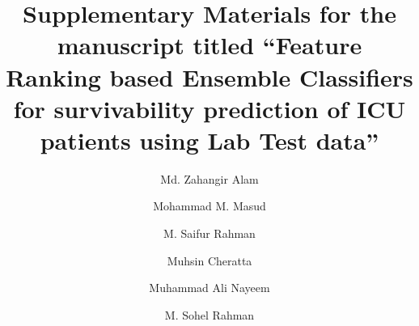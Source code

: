 \documentclass[3p,times]{elsarticle} %
\begin{document}
	
	\begin{frontmatter}
		
		
		
		
		\title{Supplementary Materials for the manuscript titled ``Feature Ranking based Ensemble Classifiers for survivability prediction of ICU patients using Lab Test data''}
		
		
		\author[buetaddress]{Md. Zahangir Alam}
		
		\author[uaeuaddress]{Mohammad M. Masud }
        
        \author[buetaddress]{M. Saifur Rahman}
		
		\author[uaeuaddress]{Muhsin Cheratta}
		
		\author[buetaddress]{Muhammad Ali Nayeem}			
					
		\author[buetaddress]{M. Sohel Rahman}
		
		
		\address[buetaddress]{Department of CSE, BUET, ECE Building, West Palasi, Dhaka-1205, Bangladesh.}
		\address[uaeuaddress]{College of Information Technology, United Arab Emirates University, Al Ain, UAE.}
		
	\end{frontmatter}
	
\end{document}
